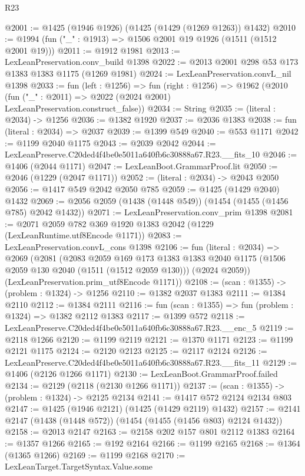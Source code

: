\begin{lexlean}{R23}
\begin{coremodule}
@2001 := @1425 (@1946 @1926) (@1425 (@1429 (@1269 @1263)) @1432)
@2010 := @1994 (fun ("_" : @1913) => @1506 @2001 @19 @1926 (@1511 (@1512 @2001 @19)))
@2011 := @1912 @1981
@2013 := LexLeanPreservation.conv_build @1398
@2022 := @2013 @2001 @298 @53 @173 @1383 @1383 @1175 (@1269 @1981)
@2024 := LexLeanPreservation.convL_nil @1398
@2033 := fun (left : @1256) =>
  fun (right : @1256) =>
  @1962 (@2010 (fun ("_" : @2011) => @2022 (@2024 @2001) LexLeanPreservation.construct_false))
@2034 := String
@2035 := (literal : @2034) -> @1256
@2036 := @1382 @1920
@2037 := @2036 @1383
@2038 := fun (literal : @2034) => @2037
@2039 := @1399 @549
@2040 := @553 @1171
@2042 := @1199 @2040 @1175
@2043 := @2039 @2042
@2044 := LexLeanPreserve.C20ded4f4be0e5011a640fb6c30888a67.R23.__fits_10
@2046 := @1406 (@2044 @1171)
@2047 := LexLeanBoot.GrammarProof.lit
@2050 := @2046 (@1229 (@2047 @1171))
@2052 := (literal : @2034) -> @2043 @2050
@2056 := @1417 @549 @2042 @2050 @785
@2059 := @1425 (@1429 @2040) @1432
@2069 := @2056 @2059 (@1438 (@1448 @549)) (@1454 (@1455 (@1456 @785) @2042 @1432))
@2071 := LexLeanPreservation.conv_prim @1398
@2081 := @2071 @2059 @782 @369 @1920 @1383 @2042 (@1229 (LexLeanRuntime.utf8Encode @1171))
@2083 := LexLeanPreservation.convL_cons @1398
@2106 := fun (literal : @2034) =>
  @2069
    (@2081
      (@2083
        @2059
        @169
        @173
        @1383
        @1383
        @2040
        @1175
        (@1506 @2059 @130 @2040 (@1511 (@1512 @2059 @130)))
        (@2024 @2059))
      (LexLeanPreservation.prim_utf8Encode @1171))
@2108 := (scan : @1355) -> (problem : @1324) -> @1256
@2110 := @1382 @2037 @1383
@2111 := @1384 @2110
@2112 := @1384 @2111
@2116 := fun (scan : @1355) => fun (problem : @1324) => @1382 @2112 @1383
@2117 := @1399 @572
@2118 := LexLeanPreserve.C20ded4f4be0e5011a640fb6c30888a67.R23.__enc_5
@2119 := @2118 @1266
@2120 := @1199 @2119
@2121 := @1370 @1171
@2123 := @1199 @2121 @1175
@2124 := @2120 @2123
@2125 := @2117 @2124
@2126 := LexLeanPreserve.C20ded4f4be0e5011a640fb6c30888a67.R23.__fits_11
@2129 := @1406 (@2126 @1266 @1171)
@2130 := LexLeanBoot.GrammarProof.failed
@2134 := @2129 (@2118 (@2130 @1266 @1171))
@2137 := (scan : @1355) -> (problem : @1324) -> @2125 @2134
@2141 := @1417 @572 @2124 @2134 @803
@2147 := @1425 (@1946 @2121) (@1425 (@1429 @2119) @1432)
@2157 := @2141 @2147 (@1438 (@1448 @572)) (@1454 (@1455 (@1456 @803) @2124 @1432))
@2158 := @2013 @2147
@2163 := @2158 @202 @157 @801 @2112 @1383
@2164 := @1357 @1266
@2165 := @192 @2164
@2166 := @1199 @2165
@2168 := @1364 (@1365 @1266)
@2169 := @1199 @2168
@2170 := LexLeanTarget.TargetSyntax.Value.some

\end{coremodule}
\end{lexlean}
